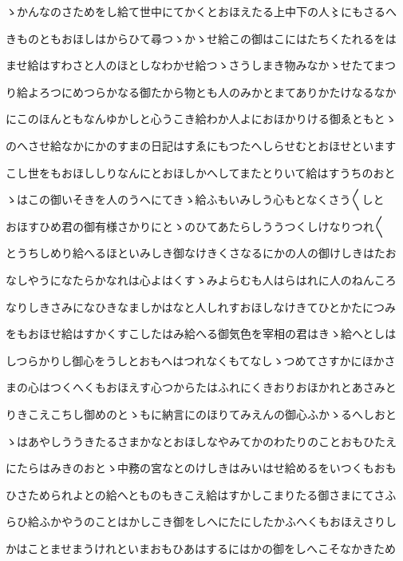 \documentclass[a4paper,11pt,landscape]{ltjtarticle}
\begin{document}
ゝかんなのさためをし給て世中にてかくとおほえたる上中下の人〻にもさるへ
\par\medskip
きものともおほしはからひて尋つゝかゝせ給この御はこにはたちくたれるをは
\par\medskip
ませ給はすわさと人のほとしなわかせ給つゝさうしまき物みなかゝせたてまつ
\par\medskip
り給よろつにめつらかなる御たから物とも人のみかとまてありかたけなるなか
\par\medskip
にこのほんともなんゆかしと心うこき給わか人よにおほかりける御ゑともとゝ
\par\medskip
のへさせ給なかにかのすまの日記はすゑにもつたへしらせむとおほせといます
\par\medskip
こし世をもおほししりなんにとおほしかへしてまたとりいて給はすうちのおと
\par\medskip
ゝはこの御いそきを人のうへにてきゝ給ふもいみしう心もとなくさう〱しと
\par\medskip
おほすひめ君の御有様さかりにとゝのひてあたらしううつくしけなりつれ〱
\par\medskip
とうちしめり給へるほといみしき御なけきくさなるにかの人の御けしきはたお
\par\medskip
なしやうになたらかなれは心よはくすゝみよらむも人はらはれに人のねんころ
\par\medskip
なりしきさみになひきなましかはなと人しれすおほしなけきてひとかたにつみ
\par\medskip
をもおほせ給はすかくすこしたはみ給へる御気色を宰相の君はきゝ給へとしは
\par\medskip
しつらかりし御心をうしとおもへはつれなくもてなしゝつめてさすかにほかさ
\par\medskip
まの心はつくへくもおほえす心つからたはふれにくきおりおほかれとあさみと
\par\medskip
りきこえこちし御めのとゝもに納言にのほりてみえんの御心ふかゝるへしおと
\par\medskip
ゝはあやしううきたるさまかなとおほしなやみてかのわたりのことおもひたえ
\par\medskip
にたらはみきのおとゝ中務の宮なとのけしきはみいはせ給めるをいつくもおも
\par\medskip
ひさためられよとの給へとものもきこえ給はすかしこまりたる御さまにてさふ
\par\medskip
らひ給ふかやうのことはかしこき御をしへにたにしたかふへくもおほえさりし
\par\medskip
かはことませまうけれといまおもひあはするにはかの御をしへこそなかきため
\par\medskip
\end{document}
